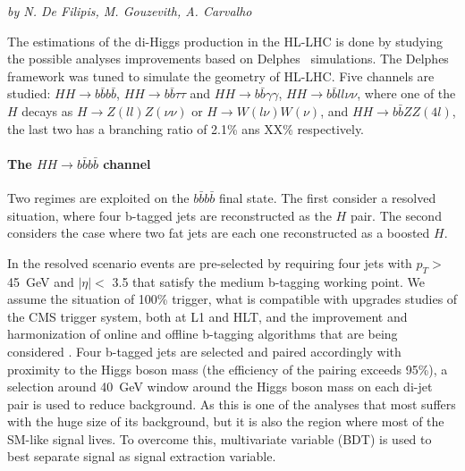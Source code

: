 \begin{center}
\textit{by N. De Filipis, M. Gouzevith, A. Carvalho}
\end{center}

The estimations of the di-Higgs production in the HL-LHC is done by studying the possible analyses improvements based on Delphes~\cite{delphes} simulations. The Delphes framework was tuned to simulate the geometry of HL-LHC. 
Five channels are studied:  $HH \rightarrow b\bar{b}b\bar{b}$, $HH \rightarrow b\bar{b}\tau\tau$ and $HH \rightarrow b\bar{b}\gamma\gamma$, $HH \rightarrow b\bar{b}ll\nu\nu$, where one of the $H$ decays as $H \rightarrow Z(ll)Z(\nu\nu)$ or $H \rightarrow W(l\nu)W(\nu)$, and $HH \rightarrow b\bar{b}ZZ(4l)$, the last two has a branching ratio of 2.1\% ans XX\% respectively.

\paragraph{The $HH \rightarrow b\bar{b}b\bar{b}$ channel}

Two regimes are exploited on the $b\bar{b}b\bar{b}$ final state. The first consider a resolved situation, where four b-tagged jets are reconstructed as the $H$ pair. The second considers the case where two fat jets are each one reconstructed as a boosted $H$.

In the resolved scenario events are pre-selected by requiring four jets with $p_T >$ 45~GeV and $|\eta| <$ 3.5 that satisfy the medium b-tagging working point. We assume the situation of 100\% trigger, what is compatible with upgrades studies of the CMS trigger system, both at L1 and HLT, and the improvement and harmonization of online and offline b-tagging algorithms that are being  considered \cite{PAS}. Four b-tagged jets are selected and paired accordingly with proximity to the Higgs boson mass (the efficiency of the pairing exceeds 95\%), a selection around 40~GeV window around the Higgs boson mass on each di-jet pair is used to reduce background. As this is one of the analyses that most suffers with the huge size of its background, but it is also the region where most of the SM-like signal lives. To overcome this, multivariate variable (BDT) is used to best separate signal as signal extraction variable. 

